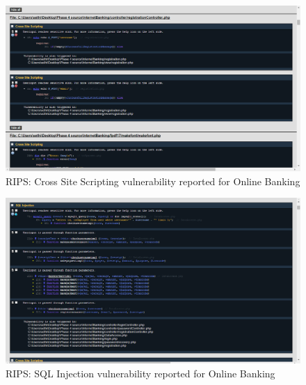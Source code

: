 \begin{figure}[ht]
	\centering
	\includegraphics[width=.8\linewidth]{figures/rips_xss.png}
	\caption{RIPS: Cross Site Scripting vulnerability reported for Online Banking}
	\label{fig:rips_xss}
\end{figure}


\begin{figure}[ht]
	\centering
	\includegraphics[width=.8\linewidth]{figures/rips_sql_injection.png}
	\caption{RIPS: SQL Injection vulnerability reported for Online Banking}
	\label{fig:rips_sql_injection}
\end{figure}



